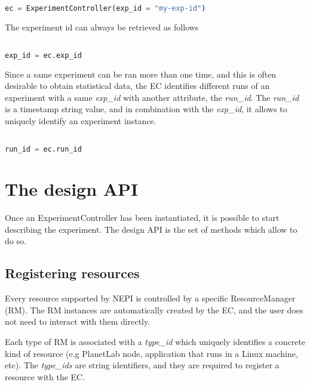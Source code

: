 \begin{lstlisting}[language=Python]

ec = ExperimentController(exp_id = "my-exp-id")

\end{lstlisting}

The experiment id can always be retrieved as follows

\begin{lstlisting}[language=Python]

exp_id = ec.exp_id 

\end{lstlisting}

Since a same experiment can be ran more than one time, and this is 
often desirable to obtain statistical data, the EC identifies 
different runs of an experiment with a same \emph{exp\_id} with  
another attribute, the \emph{run\_id}. The \emph{run\_id} is
a timestamp string value, and in combination with the \emph{exp\_id},
it allows to uniquely identify an experiment instance.

\begin{lstlisting}[language=Python]

run_id = ec.run_id 

\end{lstlisting}



\section{The design API}

Once an ExperimentController has been instantiated, it is possible to start
describing the experiment. The design API is the set of methods which
allow to do so.


\subsection{Registering resources}

Every resource supported by NEPI is controlled by a specific ResourceManager 
(RM). The RM instances are automatically created by the EC, and the user does 
not need to interact with them directly. 

Each type of RM is associated with a \emph{type\_id} which uniquely identifies 
a concrete kind of resource (e.g PlanetLab node, application that runs in
a Linux machine, etc).
The \emph{type\_ids} are string identifiers, and they are required  
to register a resource with the EC.


